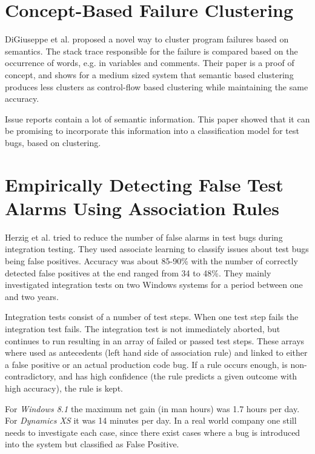 \documentclass{uvamscse}
\begin{document}
\section{Concept-Based Failure Clustering}
DiGiuseppe et al. \cite{digiuseppe2012concept} proposed a novel way to cluster program failures based on semantics. The stack trace responsible for the failure is compared based on the occurrence of words, e.g. in variables and comments. Their paper is a proof of concept, and shows for a medium sized system that semantic based clustering produces less clusters as control-flow based clustering while maintaining the same accuracy. 

Issue reports contain a lot of semantic information. This paper showed that it can be promising to incorporate this information into a classification model for test bugs, based on clustering. 


\section{Empirically Detecting False Test Alarms Using Association Rules}

Herzig et al. \cite{herzig2015empirically} tried to reduce the number of false alarms in test bugs during integration testing. They used associate learning to classify issues about test bugs being false positives. Accuracy was about 85-90\% with the number of correctly detected false positives at the end ranged from 34 to 48\%. They mainly investigated integration tests on two Windows systems for a period between one and two years. 

Integration tests consist of a number of test steps. When one test step fails the integration test fails. The integration test is not immediately aborted, but continues to run resulting in an array of failed or passed test steps. These arrays where used as antecedents (left hand side of association rule) and linked to either a false positive or an actual production code bug. If a rule occurs enough, is non-contradictory, and has high confidence (the rule predicts a given outcome with high accuracy), the rule is kept. 

For \textit{Windows 8.1} the maximum net gain (in man hours) was 1.7 hours per day. For \textit{Dynamics XS} it was 14 minutes per day. In a real world company one still needs to investigate each case, since there exist cases where a bug is introduced into the system but classified as False Positive. 
\end{document}

